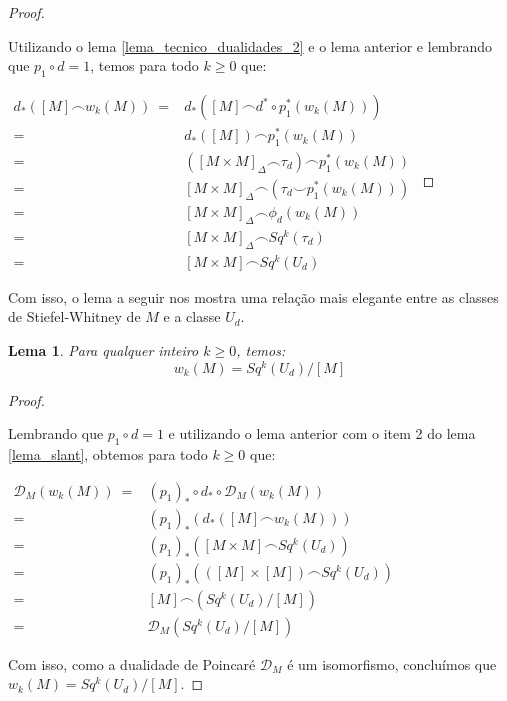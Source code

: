 \documentclass[12pt,oneside]{book} %
\newtheorem{lem}    {\hspace{0.5cm}Lema}[chapter]
\newcommand{\ccup}{\smile}
\newcommand{\ccap}{\frown}
\begin{document}
\begin{proof}
	
	\
	
	\par Utilizando o lema \ref{lema_tecnico_dualidades_2} e o lema anterior e lembrando que $p_{1}\circ d=1$, temos para todo $k\geq 0$ que: \newline
	
	$\begin{array}{rl}
		d_{*}([M]\ccap w_{k}(M)) \ = & d_{*}([M]\ccap d^{*}\circ p_{1}^{*}(w_{k}(M))) \\
		= & d_{*}([M])\ccap p_{1}^{*}(w_{k}(M)) \\
		= & \left( [M\times M]_{\Delta}\ccap \tau_{d} \right) \ccap p_{1}^{*}(w_{k}(M)) \\
		= & [M\times M]_{\Delta} \ccap \left( \tau_{d}\ccup p_{1}^{*}(w_{k}(M)) \right) \\
		= & [M\times M]_{\Delta} \ccap \phi_{d}(w_{k}(M)) \\
		= & [M\times M]_{\Delta} \ccap Sq^{k}(\tau_{d}) \\
		= & [M\times M]\ccap Sq^{k}(U_{d})
	\end{array}$
	
\end{proof}

\par Com isso, o lema a seguir nos mostra uma relação mais elegante entre as classes de Stiefel-Whitney de $M$ e a classe $U_{d}$.

\begin{lem}
	Para qualquer inteiro $k\geq 0$, temos:
	$$ w_{k}(M)=Sq^{k}(U_{d})/[M] $$
\end{lem}
\begin{proof}
	
	\
	
	\par Lembrando que $p_{1}\circ d=1$ e utilizando o lema anterior com o item 2 do lema \ref{lema_slant}, obtemos para todo $k\geq 0$ que:\newline
	
	$\begin{array}{rl}
		\mathcal{D}_{M}(w_{k}(M)) \ = & (p_{1})_{*}\circ d_{*}\circ \mathcal{D}_{M}(w_{k}(M)) \\
		= & (p_{1})_{*}\left( d_{*}\left( [M]\ccap w_{k}(M) \right) \right) \\
		= & (p_{1})_{*}\left( [M\times M]\ccap Sq^{k}(U_{d}) \right) \\
		= & (p_{1})_{*}\left( \left( [M]\times [M] \right)\ccap Sq^{k}(U_{d}) \right) \\
		= & [M]\ccap \left( Sq^{k}(U_{d})/[M] \right) \\
		= & \mathcal{D}_{M}(Sq^{k}(U_{d})/[M]) 
	\end{array}$\newline
	
	\par Com isso, como a dualidade de Poincaré $\mathcal{D}_{M}$ é um isomorfismo, concluímos que $w_{k}(M)=Sq^{k}(U_{d})/[M]$.
	
\end{proof}
\end{document}
